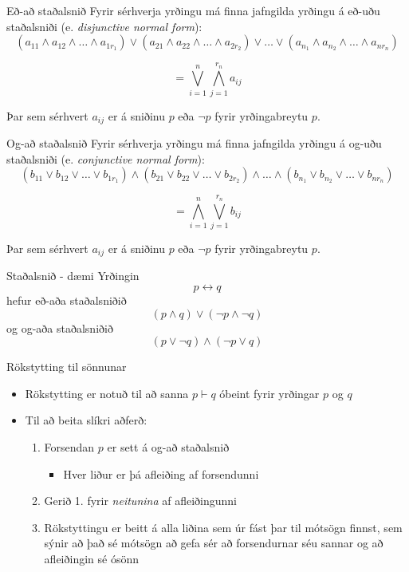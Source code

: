 \documentclass{beamer}
\begin{document}
\begin{frame}{Eð-að staðalsnið}
Fyrir sérhverja yrðingu má finna jafngilda yrðingu á eð-uðu staðalsniði (e. \emph{disjunctive normal form}):
\[
 (a_{11} \land a_{12} \land \ldots \land a_{1r_1} ) \lor (a_{21} \land a_{22} \land \ldots \land a_{2r_2} ) \lor \ldots \lor (a_{n_1} \land a_{n_2} \land \ldots \land a_{nr_n} )
\]

\[
 = \bigvee_{i=1}^n \bigwedge_{j=1}^{r_n}a_{ij}
\]

Þar sem sérhvert $a_{ij}$ er á sniðinu $p$ eða $\lnot p$ fyrir yrðingabreytu $p$.
\end{frame}

\begin{frame}{Og-að staðalsnið}
Fyrir sérhverja yrðingu má finna jafngilda yrðingu á og-uðu staðalsniði (e. \emph{conjunctive normal form}):
\[
 (b_{11} \lor b_{12} \lor \ldots \lor b_{1r_1} ) \land (b_{21} \lor b_{22} \lor \ldots \lor b_{2r_2} ) \land \ldots \land (b_{n_1} \lor b_{n_2} \lor \ldots \lor b_{nr_n} )
\]

\[
 = \bigwedge_{i=1}^n \bigvee_{j=1}^{r_n}b_{ij}
\]

Þar sem sérhvert $a_{ij}$ er á sniðinu $p$ eða $\lnot p$ fyrir yrðingabreytu $p$.
\end{frame}

\begin{frame}{Staðalsnið - dæmi}
Yrðingin
\[
 p \leftrightarrow q
\]
hefur eð-aða staðalsniðið
\[
 (p \land q) \lor (\lnot p \land \lnot q)
\]
og og-aða staðalsniðið
\[
 (p \lor \lnot q) \land (\lnot p \lor q)
\]
\end{frame}

\begin{frame}{Rökstytting til sönnunar}
\begin{itemize}
 \item Rökstytting er notuð til að sanna $p \vdash q$ óbeint fyrir yrðingar $p$ og $q$
 \item Til að beita slíkri aðferð:
 \begin{enumerate}
  \item Forsendan $p$ er sett á og-að staðalsnið
  \begin{itemize}
   \item Hver liður er þá afleiðing af forsendunni
  \end{itemize}
  \item Gerið 1. fyrir \emph{neitunina} af afleiðingunni
  \item Rökstyttingu er beitt á alla liðina sem úr fást þar til mótsögn finnst, sem sýnir að það sé mótsögn að gefa sér að forsendurnar séu sannar og að afleiðingin sé ósönn
 \end{enumerate}
\end{itemize}
\end{frame}
\end{document}
